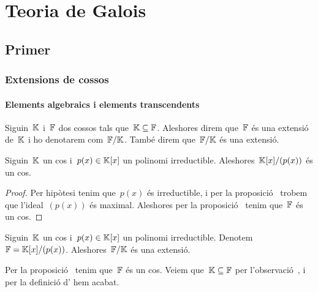 \documentclass[../Apunts.tex]{subfiles}
\begin{document}
\part{Teoria de Galois}
\chapter[Capítol primer]{Primer}
\section{Extensions de cossos}
\subsection{Elements algebraics i elements transcendents}
	\begin{definition}
		\label{def:extensió de cossos}
		Siguin~\(\mathbb{K}\) i~\(\mathbb{F}\) dos cossos tals que~\(\mathbb{K}\subseteq\mathbb{F}\). Aleshores direm que~\(\mathbb{F}\) és una extensió de~\(\mathbb{K}\) i ho denotarem com~\(\mathbb{F}/\mathbb{K}\). També direm que~\(\mathbb{F}/\mathbb{K}\) és una extensió.
	\end{definition}
	\begin{proposition} %
		\label{prop:un cos quocient un irreductible és un cos}
		Siguin~\(\mathbb{K}\) un cos i~\(p(x)\in\mathbb{K}[x]\) un polinomi irreductible. Aleshores~\(\mathbb{K}[x]/(p(x))\) és un cos.
		\begin{proof} %
			Per hipòtesi tenim que~\(p(x)\) és irreductible, i per la proposició~ trobem que l'ideal~\((p(x))\) és maximal. Aleshores per la proposició~ tenim que~\(\mathbb{F}\) és un cos.
		\end{proof}
	\end{proposition}
	\begin{example}
		\label{ex:el cos de polinomis és una extensió}
		Siguin~\(\mathbb{K}\) un cos i~\(p(x)\in\mathbb{K}[x]\) un polinomi irreductible. Denotem~\(\mathbb{F}=\mathbb{K}[x]/(p(x))\). Aleshores~\(\mathbb{F}/\mathbb{K}\) és una extensió.
		\begin{solution}
			Per la proposició~ tenim que~\(\mathbb{F}\) és un cos. Veiem que~\(\mathbb{K}\subseteq\mathbb{F}\) per l'observació~, i per la definició d' hem acabat.
		\end{solution}
	\end{example}
\end{document}
